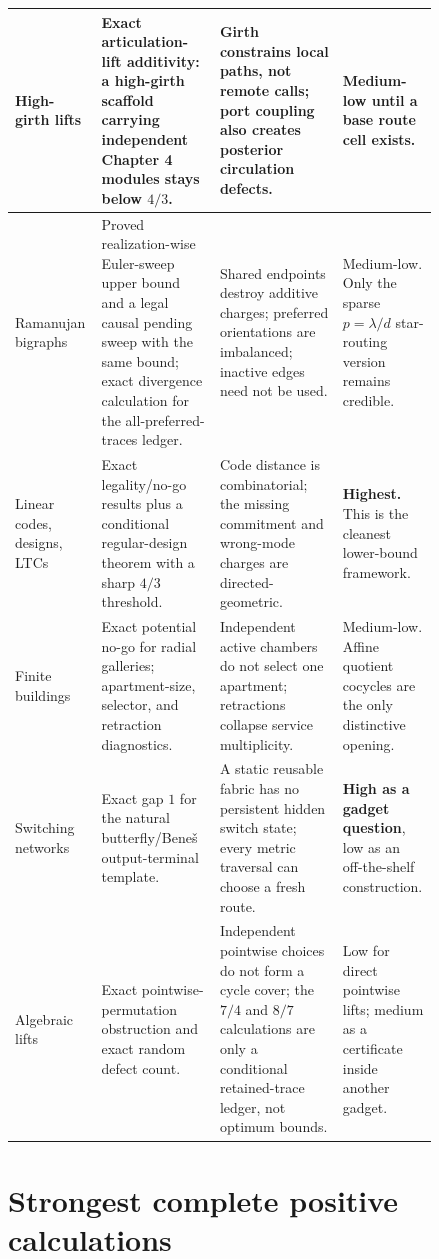 \documentclass[11pt,a4paper]{article}
\begin{document}
\begin{landscape}
\begin{longtable}{>{\raggedright\arraybackslash}p{0.15\linewidth}>{\raggedright\arraybackslash}p{0.27\linewidth}>{\raggedright\arraybackslash}p{0.28\linewidth}>{\raggedright\arraybackslash}p{0.14\linewidth}}
\hline
High-girth lifts & Exact articulation-lift additivity: a high-girth scaffold carrying independent Chapter 4 modules stays below \(4/3\). & Girth constrains local paths, not remote calls; port coupling also creates posterior circulation defects. & Medium-low until a base route cell exists. \\
\hline
Ramanujan bigraphs & Proved realization-wise Euler-sweep upper bound and a legal causal pending sweep with the same bound; exact divergence calculation for the all-preferred-traces ledger. & Shared endpoints destroy additive charges; preferred orientations are imbalanced; inactive edges need not be used. & Medium-low. Only the sparse \(p=\lambda/d\) star-routing version remains credible. \\
\hline
Linear codes, designs, LTCs & Exact legality/no-go results plus a conditional regular-design theorem with a sharp \(4/3\) threshold. & Code distance is combinatorial; the missing commitment and wrong-mode charges are directed-geometric. & \textbf{Highest.} This is the cleanest lower-bound framework. \\
\hline
Finite buildings & Exact potential no-go for radial galleries; apartment-size, selector, and retraction diagnostics. & Independent active chambers do not select one apartment; retractions collapse service multiplicity. & Medium-low. Affine quotient cocycles are the only distinctive opening. \\
\hline
Switching networks & Exact gap \(1\) for the natural butterfly/Beneš output-terminal template. & A static reusable fabric has no persistent hidden switch state; every metric traversal can choose a fresh route. & \textbf{High as a gadget question}, low as an off-the-shelf construction. \\
\hline
Algebraic lifts & Exact pointwise-permutation obstruction and exact random defect count. & Independent pointwise choices do not form a cycle cover; the \(7/4\) and \(8/7\) calculations are only a conditional retained-trace ledger, not optimum bounds. & Low for direct pointwise lifts; medium as a certificate inside another gadget. \\
\hline
\end{longtable}
\endgroup

\end{landscape}

\section*{Strongest complete positive calculations}
\end{document}
